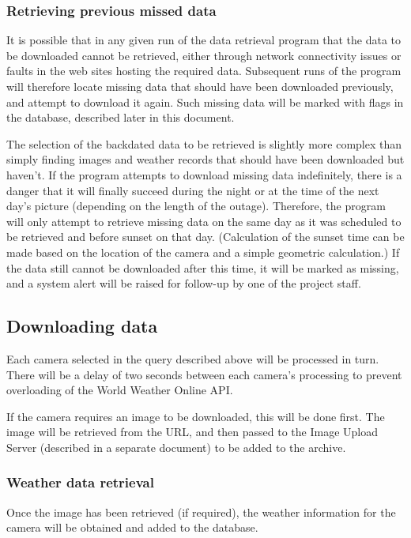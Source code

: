 \documentclass[11pt]{article}
\begin{document}
\subsubsection{Retrieving previous missed data}
It is possible that in any given run of the data retrieval program that the data to be downloaded cannot be retrieved, either through network connectivity issues or faults in the web sites hosting the required data. Subsequent runs of the program will therefore locate missing data that should have been downloaded previously, and attempt to download it again. Such missing data will be marked with flags in the database, described later in this document.

The selection of the backdated data to be retrieved is slightly more complex than simply finding images and weather records that should have been downloaded but haven't. If the program attempts to download missing data indefinitely, there is a danger that it will finally succeed during the night or at the time of the next day's picture (depending on the length of the outage). Therefore, the program will only attempt to retrieve missing data on the same day as it was scheduled to be retrieved and before sunset on that day. (Calculation of the sunset time can be made based on the location of the camera and a simple geometric calculation.) If the data still cannot be downloaded after this time, it will be marked as missing, and a system alert will be raised for follow-up by one of the project staff.

\subsection{Downloading data}
Each camera selected in the query described above will be processed in turn. There will be a delay of two seconds between each camera's processing to prevent overloading of the World Weather Online API.

If the camera requires an image to be downloaded, this will be done first. The image will be retrieved from the URL, and then passed to the Image Upload Server (described in a separate document) to be added to the archive.

\subsubsection{Weather data retrieval}
Once the image has been retrieved (if required), the weather information for the camera will be obtained and added to the database.
\end{document}

